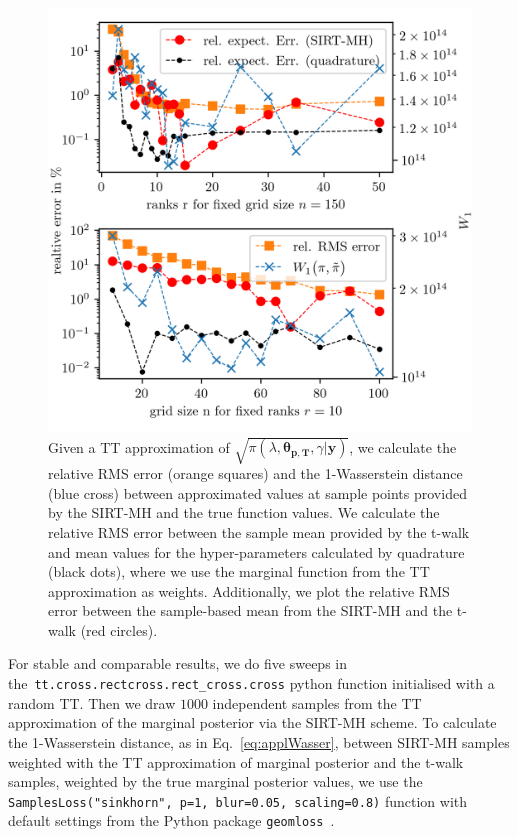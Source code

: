 \begin{figure}[ht!]
	\centering%
	\includegraphics[]{findGridRank.png}
	\caption[Optimal rank and number of grid points for TT approximation.]{Given a TT approximation of $\sqrt{\pi( \lambda,\bm{\theta}_{\bm{p}, \bm{T}},\gamma  | \bm{y}) }$, we calculate the relative RMS error (orange squares) and the 1-Wasserstein distance (blue cross) between approximated values at sample points provided by the SIRT-MH and the true function values. We calculate the relative RMS error between the sample mean provided by the t-walk and mean values for the hyper-parameters calculated by quadrature (black dots), where we use the marginal function from the TT approximation as weights. Additionally, we plot the relative RMS error between the sample-based mean from the SIRT-MH and the t-walk (red circles).}
	\label{fig:FindRankGrid}
\end{figure}
For stable and comparable results, we do five sweeps in \linebreak the~\texttt{tt.cross.rectcross.rect\_cross.cross} python function initialised with a random TT.
Then we draw $1000$ independent samples from the TT approximation of the marginal posterior via the SIRT-MH scheme. 
To calculate the 1-Wasserstein distance, as in Eq.~\ref{eq:applWasser}, between SIRT-MH samples weighted with the TT approximation of marginal posterior and the t-walk samples, weighted by the true marginal posterior values, we use the \texttt{SamplesLoss("sinkhorn", p=1, blur=0.05, scaling=0.8)} function with default settings from the Python package \texttt{geomloss}~\cite{Wassersteinaccess}.
